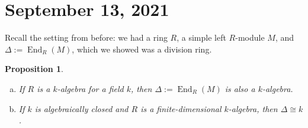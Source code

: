 \documentclass[10pt]{article}
\numberwithin{equation}{section}
\DeclareMathOperator{\End}{End}
\theoremstyle{newstyle}
\newtheorem{prop}[thm]{Proposition}
\begin{document}
\section{September 13, 2021}
Recall the setting from before: we had a ring $R$, a simple left $R$-module $M$,
and $\Delta := \End_R(M)$, which we showed was a division ring. 

\begin{prop}~
\begin{enumerate}[(a)]
    \item If $R$ is a $k$-algebra for a field $k$, then $\Delta := \End_R(M)$ is also a $k$-algebra. 
    \item If $k$ is algebraically closed and $R$ is a finite-dimensional $k$-algebra, then $\Delta 
    \cong k$. 
\end{enumerate}
\end{prop}
\end{document}

